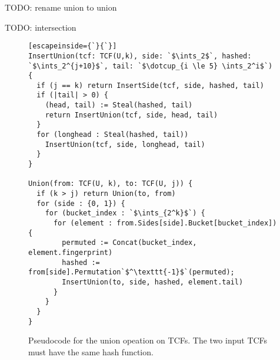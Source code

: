 \documentclass[manuscript,screen,review]{acmart}
\newcommand{\ints}{\mathbb{Z}}
\newcommand{\dotcup}{\ensuremath{\mathaccent\cdot\cup}}
\begin{document}
TODO: rename union to union

TODO: intersection


\begin{figure}
\begin{lstlisting}[escapeinside={`}{`}]
InsertUnion(tcf: TCF(U,k), side: `$\ints_2$`, hashed: `$\ints_2^{j+10}$`, tail: `$\dotcup_{i \le 5} \ints_2^i$`) {
  if (j == k) return InsertSide(tcf, side, hashed, tail)
  if (|tail| > 0) {
    (head, tail) := Steal(hashed, tail)
    return InsertUnion(tcf, side, head, tail)
  }
  for (longhead : Steal(hashed, tail))
    InsertUnion(tcf, side, longhead, tail)
  }
}

Union(from: TCF(U, k), to: TCF(U, j)) {
  if (k > j) return Union(to, from)
  for (side : {0, 1}) {
    for (bucket_index : `$\ints_{2^k}$`) {
      for (element : from.Sides[side].Bucket[bucket_index]) {
        permuted := Concat(bucket_index, element.fingerprint)
        hashed := from[side].Permutation`$^\texttt{-1}$`(permuted);
        InsertUnion(to, side, hashed, element.tail)
      }
    }
  }
}
\end{lstlisting}
\caption{
Pseudocode for the union opeation on TCFs.
The two input TCFs must have the same hash function.
}
\end{figure}






\end{document}
